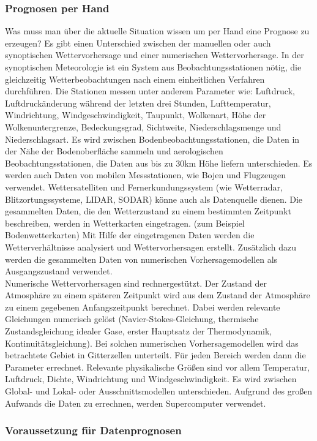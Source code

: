 \documentclass[a4paper,oneside,12pt,titlepage]{article}
\begin{document}
\subsubsection{Prognosen per Hand} %
Was muss man über die aktuelle Situation wissen um per Hand eine Prognose zu erzeugen?
Es gibt einen Unterschied zwischen der manuellen oder auch synoptischen Wettervorhersage und einer numerischen Wettervorhersage. In der synoptischen Meteorologie ist ein System aus Beobachtungsstationen nötig, die gleichzeitig Wetterbeobachtungen nach einem einheitlichen Verfahren durchführen. Die Stationen messen unter anderem Parameter wie: Luftdruck, Luftdruckänderung während der letzten drei Stunden, Lufttemperatur, Windrichtung, Windgeschwindigkeit, Taupunkt, Wolkenart, Höhe der Wolkenuntergrenze, Bedeckungsgrad, Sichtweite, Niederschlagsmenge und Niederschlagsart. Es wird zwischen Bodenbeobachtungsstationen, die Daten in der Nähe der Bodenoberfläche sammeln und aerologischen Beobachtungsstationen, die Daten aus bis zu 30km Höhe liefern unterschieden. Es werden auch Daten von mobilen Messstationen, wie Bojen und Flugzeugen verwendet. Wettersatelliten und Fernerkundungssystem (wie Wetterradar, Blitzortungssysteme, LIDAR, SODAR) könne auch als Datenquelle dienen. Die gesammelten Daten, die den Wetterzustand zu einem bestimmten Zeitpunkt beschreiben, werden in Wetterkarten eingetragen. (zum Beispiel Bodenwetterkarten) Mit Hilfe der eingetragenen Daten werden die Wetterverhältnisse analysiert und Wettervorhersagen erstellt. Zusätzlich dazu werden die gesammelten Daten von numerischen Vorhersagemodellen als Ausgangszustand verwendet. %
\\
Numerische Wettervorhersagen sind rechnergestützt. Der Zustand der Atmosphäre zu einem späteren Zeitpunkt wird aus dem Zustand der Atmosphäre zu einem gegebenen Anfangszeitpunkt berechnet. Dabei werden relevante Gleichungen numerisch gelöst (Navier-Stokes-Gleichung, thermische Zustandsgleichung idealer Gase, erster Hauptsatz der Thermodynamik, Kontinuitätsgleichung). Bei solchen numerischen Vorhersagemodellen wird das betrachtete Gebiet in Gitterzellen unterteilt. Für jeden Bereich werden dann die Parameter errechnet. Relevante physikalische Größen sind vor allem Temperatur, Luftdruck, Dichte, Windrichtung und Windgeschwindigkeit. Es wird zwischen Global- und Lokal- oder Ausschnittsmodellen unterschieden. Aufgrund des großen Aufwands die Daten zu errechnen, werden Supercomputer verwendet.

\subsubsection{Voraussetzung für Datenprognosen} %
\end{document}
